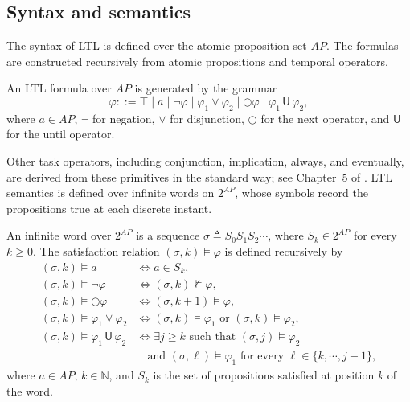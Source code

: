\subsection{Syntax and semantics}
\label{ch02:subsec:syntax}

The syntax of LTL is defined over the atomic proposition set $AP$. The formulas
are constructed recursively from atomic propositions and temporal operators.

\begin{definition}
\label{ch02:def:ltl_syntax}
An LTL formula over $AP$ is generated by the grammar
\begin{equation}
\varphi ::= \top \mid a \mid \neg \varphi \mid \varphi_1 \vee \varphi_2
\mid \bigcirc \varphi \mid \varphi_1 \,\mathsf{U}\, \varphi_2,
\label{ch02:eq:LTLsyntax}
\end{equation}
where $a \in AP$, $\neg$ for negation,
$\vee$ for disjunction, $\bigcirc$ for the next operator, and
$\mathsf{U}$ for the until operator.
\end{definition}

Other task operators, including conjunction, implication, always, and
eventually, are derived from these primitives in the standard way; see
Chapter~5 of \citet{baier2008principles}. LTL semantics is defined over
infinite words on $2^{AP}$, whose symbols record the propositions true at each
discrete instant.

\begin{definition}
\label{ch02:def:word_semantics}
An infinite word over $2^{AP}$ is a sequence
$\sigma \triangleq S_0 S_1 S_2 \cdots$, where
$S_k \in 2^{AP}$ for every $k \geq 0$. The satisfaction relation
$(\sigma,k) \models \varphi$ is defined recursively by
\begin{equation}
\begin{aligned}
(\sigma,k) \models a
&\iff a \in S_k, \\
(\sigma,k) \models \neg \varphi
&\iff (\sigma,k) \not\models \varphi, \\
(\sigma,k) \models \bigcirc \varphi
&\iff (\sigma,k+1) \models \varphi, \\
(\sigma,k) \models \varphi_1 \vee \varphi_2
&\iff (\sigma,k) \models \varphi_1
\text{ or } (\sigma,k) \models \varphi_2, \\
(\sigma,k) \models \varphi_1 \,\mathsf{U}\, \varphi_2
&\iff \exists j \geq k \text{ such that }
(\sigma,j) \models \varphi_2 \\
&\quad \text{and }
(\sigma,\ell) \models \varphi_1
\text{ for every } \ell \in \{k,\cdots,j-1\},
\end{aligned}
\label{ch02:eq:ltl_semantics}
\end{equation}
where $a \in AP$, $k \in \mathbb{N}$, and $S_k$ is the set of propositions
satisfied at position $k$ of the word.
\end{definition}

